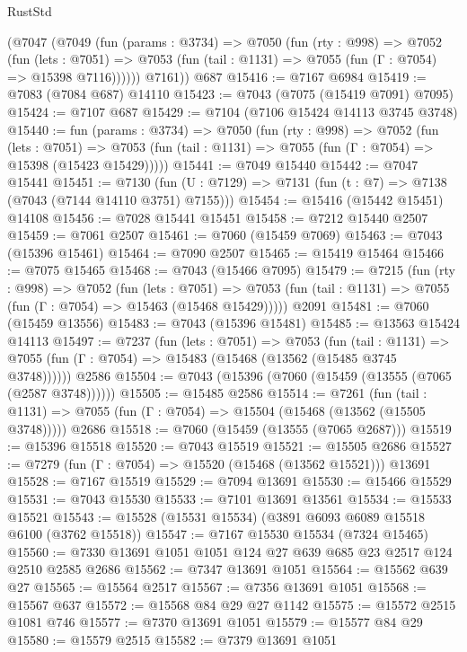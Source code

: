 \begin{lexlean}{RustStd}
\begin{coremodule}
      (@7047
        (@7049
          (fun (params : @3734) =>
          @7050
            (fun (rty : @998) =>
            @7052
              (fun (lets : @7051) =>
              @7053 (fun (tail : @1131) => @7055 (fun (Γ : @7054) => @15398 @7116))))))
        @7161))
    @687
@15416 := @7167 @6984
@15419 := @7083 (@7084 @687) @14110
@15423 := @7043 (@7075 (@15419 @7091) @7095)
@15424 := @7107 @687
@15429 := @7104 (@7106 @15424 @14113 @3745 @3748)
@15440 := fun (params : @3734) =>
  @7050
    (fun (rty : @998) =>
    @7052
      (fun (lets : @7051) =>
      @7053 (fun (tail : @1131) => @7055 (fun (Γ : @7054) => @15398 (@15423 @15429)))))
@15441 := @7049 @15440
@15442 := @7047 @15441
@15451 := @7130
    (fun (U : @7129) => @7131 (fun (t : @7) => @7138 (@7043 (@7144 @14110 @3751) @7155)))
@15454 := @15416 (@15442 @15451) @14108
@15456 := @7028 @15441 @15451
@15458 := @7212 @15440 @2507
@15459 := @7061 @2507
@15461 := @7060 (@15459 @7069)
@15463 := @7043 (@15396 @15461)
@15464 := @7090 @2507
@15465 := @15419 @15464
@15466 := @7075 @15465
@15468 := @7043 (@15466 @7095)
@15479 := @7215
    (fun (rty : @998) =>
    @7052
      (fun (lets : @7051) =>
      @7053 (fun (tail : @1131) => @7055 (fun (Γ : @7054) => @15463 (@15468 @15429)))))
    @2091
@15481 := @7060 (@15459 @13556)
@15483 := @7043 (@15396 @15481)
@15485 := @13563 @15424 @14113
@15497 := @7237
    (fun (lets : @7051) =>
    @7053
      (fun (tail : @1131) =>
      @7055 (fun (Γ : @7054) => @15483 (@15468 (@13562 (@15485 @3745 @3748))))))
    @2586
@15504 := @7043 (@15396 (@7060 (@15459 (@13555 (@7065 (@2587 @3748))))))
@15505 := @15485 @2586
@15514 := @7261
    (fun (tail : @1131) => @7055 (fun (Γ : @7054) => @15504 (@15468 (@13562 (@15505 @3748)))))
    @2686
@15518 := @7060 (@15459 (@13555 (@7065 @2687)))
@15519 := @15396 @15518
@15520 := @7043 @15519
@15521 := @15505 @2686
@15527 := @7279 (fun (Γ : @7054) => @15520 (@15468 (@13562 @15521))) @13691
@15528 := @7167 @15519
@15529 := @7094 @13691
@15530 := @15466 @15529
@15531 := @7043 @15530
@15533 := @7101 @13691 @13561
@15534 := @15533 @15521
@15543 := @15528 (@15531 @15534) (@3891 @6093 @6089 @15518 @6100 (@3762 @15518))
@15547 := @7167 @15530 @15534 (@7324 @15465)
@15560 := @7330 @13691 @1051 @1051 @124 @27 @639 @685 @23 @2517 @124 @2510 @2585 @2686
@15562 := @7347 @13691 @1051
@15564 := @15562 @639 @27
@15565 := @15564 @2517
@15567 := @7356 @13691 @1051
@15568 := @15567 @637
@15572 := @15568 @84 @29 @27 @1142
@15575 := @15572 @2515 @1081 @746
@15577 := @7370 @13691 @1051
@15579 := @15577 @84 @29
@15580 := @15579 @2515
@15582 := @7379 @13691 @1051

\end{coremodule}
\end{lexlean}
